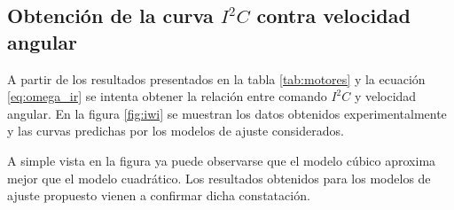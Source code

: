 \documentclass[main]{subfiles}
\begin{document}
\begin{figure}[H]
  \vspace{-20pt}
\hspace{-50pt}
  \vspace{-5pt}
  \caption{}  
  \vspace{-10pt}
\end{figure}

\subsection{Obtenci\'on de la curva $I^2C$ contra velocidad angular}

A partir de los resultados presentados en la tabla \ref{tab:motores} y la ecuaci\'on \ref{eq:omega_ir} se intenta obtener la relaci\'on entre comando $I^2C$ y velocidad angular. En la figura \ref{fig:iwi} se muestran los datos obtenidos experimentalmente y las curvas predichas por los modelos de ajuste considerados.

A simple vista en la figura ya puede observarse que el modelo c\'ubico aproxima mejor que el modelo cuadr\'atico.
Los resultados obtenidos para los modelos de ajuste propuesto vienen a confirmar dicha constataci\'on.
\end{document}
